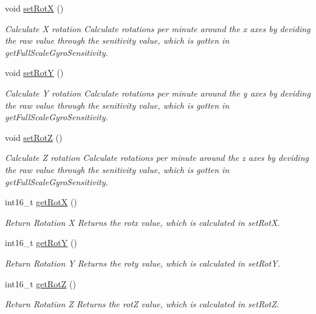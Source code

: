 \begin{DoxyCompactItemize}
void \mbox{\hyperlink{class_m_p_u6050_ad1cfcae9653af68ac64361fcb66b7824}{set\+RotX}} ()
\begin{DoxyCompactList}\small\item\em Calculate X rotation  Calculate rotations per minute around the x axes by deviding the raw value through the senitivity value, which is gotten in get\+Full\+Scale\+Gyro\+Sensitivity. \end{DoxyCompactList}\item 
void \mbox{\hyperlink{class_m_p_u6050_ad8d0842faf2f95f4609111d14d432e5e}{set\+RotY}} ()
\begin{DoxyCompactList}\small\item\em Calculate Y rotation  Calculate rotations per minute around the y axes by deviding the raw value through the senitivity value, which is gotten in get\+Full\+Scale\+Gyro\+Sensitivity. \end{DoxyCompactList}\item 
void \mbox{\hyperlink{class_m_p_u6050_a731b428be8965d86832124c0e429019d}{set\+RotZ}} ()
\begin{DoxyCompactList}\small\item\em Calculate Z rotation  Calculate rotations per minute around the z axes by deviding the raw value through the senitivity value, which is gotten in get\+Full\+Scale\+Gyro\+Sensitivity. \end{DoxyCompactList}\item 
int16\+\_\+t \mbox{\hyperlink{class_m_p_u6050_acf1eaa804de62955ddd1c629e5b7183b}{get\+RotX}} ()
\begin{DoxyCompactList}\small\item\em Return Rotation X  Returns the rotx value, which is calculated in set\+RotX. \end{DoxyCompactList}\item 
int16\+\_\+t \mbox{\hyperlink{class_m_p_u6050_abbbcdf91120387b4c3a403640622c431}{get\+RotY}} ()
\begin{DoxyCompactList}\small\item\em Return Rotation Y  Returns the roty value, which is calculated in set\+RotY. \end{DoxyCompactList}\item 
int16\+\_\+t \mbox{\hyperlink{class_m_p_u6050_a82a4cae5502dff15b75aa43ab0a03ebf}{get\+RotZ}} ()
\begin{DoxyCompactList}\small\item\em Return Rotation Z  Returns the rotZ value, which is calculated in set\+RotZ. \end{DoxyCompactList}\end{DoxyCompactItemize}


